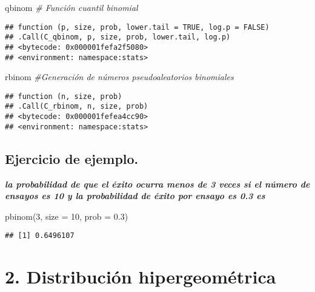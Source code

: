 \documentclass[
]{article}
\newenvironment{Shaded}{\begin{snugshade}}{\end{snugshade}}
\newcommand{\AttributeTok}[1]{\textcolor[rgb]{0.77,0.63,0.00}{#1}}
\newcommand{\CommentTok}[1]{\textcolor[rgb]{0.56,0.35,0.01}{\textit{#1}}}
\newcommand{\DecValTok}[1]{\textcolor[rgb]{0.00,0.00,0.81}{#1}}
\newcommand{\FloatTok}[1]{\textcolor[rgb]{0.00,0.00,0.81}{#1}}
\newcommand{\FunctionTok}[1]{\textcolor[rgb]{0.00,0.00,0.00}{#1}}
\newcommand{\NormalTok}[1]{#1}
\begin{document}
\begin{Shaded}
\begin{Highlighting}[]
\NormalTok{qbinom }\CommentTok{\#    Función cuantil binomial}
\end{Highlighting}
\end{Shaded}

\begin{verbatim}
## function (p, size, prob, lower.tail = TRUE, log.p = FALSE) 
## .Call(C_qbinom, p, size, prob, lower.tail, log.p)
## <bytecode: 0x000001fefa2f5080>
## <environment: namespace:stats>
\end{verbatim}

\begin{Shaded}
\begin{Highlighting}[]
\NormalTok{rbinom  }\CommentTok{\#Generación de números pseudoaleatorios binomiales}
\end{Highlighting}
\end{Shaded}

\begin{verbatim}
## function (n, size, prob) 
## .Call(C_rbinom, n, size, prob)
## <bytecode: 0x000001fefea4cc90>
## <environment: namespace:stats>
\end{verbatim}

\hypertarget{ejercicio-de-ejemplo.}{%
\subsection{Ejercicio de ejemplo.}\label{ejercicio-de-ejemplo.}}

\textbf{\emph{la probabilidad de que el éxito ocurra menos de 3 veces si
el número de ensayos es 10 y la probabilidad de éxito por ensayo es 0.3
es}}

\begin{Shaded}
\begin{Highlighting}[]
\FunctionTok{pbinom}\NormalTok{(}\DecValTok{3}\NormalTok{, }\AttributeTok{size =} \DecValTok{10}\NormalTok{, }\AttributeTok{prob =} \FloatTok{0.3}\NormalTok{)}
\end{Highlighting}
\end{Shaded}

\begin{verbatim}
## [1] 0.6496107
\end{verbatim}

\hypertarget{distribuciuxf3n-hipergeomuxe9trica}{%
\section{2. Distribución
hipergeométrica}\label{distribuciuxf3n-hipergeomuxe9trica}}
\end{document}
